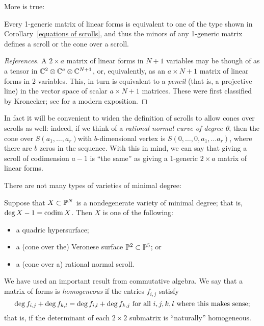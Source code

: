 More is true: 
\begin{fact}
 Every
 1-generic matrix of linear forms is equivalent to one of the type shown in
Corollary~\ref{equations of scrolls}, and thus the minors of any 1-generic matrix defines a scroll or the cone over a scroll.
\end{fact}

\begin{proof}[References]
A $2\times a$ matrix of linear forms in $N+1$ variables may be though of as a tensor
in $\CC^{2}\otimes \CC^{a}\otimes \CC^{N+1}$, or, equivalently, as an $a\times N+1$ matrix of linear forms in 2 variables. This, in turn is equivalent to a \emph{pencil} (that is, a projective line) in the vector space of scalar $a\times N+1$ matrices. These were first classified by Kronecker; see 
\cite[Theorems *** and ***]{Gantmacher} for a modern exposition. 
\end{proof}

In fact it will be convenient to widen the definition of scrolls to allow cones over scrolls as well: indeed, if we think of a \emph{rational normal curve of degree 0}, then the cone over $S(a_{1}, \dots, a_{r})$with $b$-dimensional  vertex is $S(0,\dots,0, a_{1}, \dots a_{r})$, where there are 
$b$ zeros in the sequence. With this in mind, we can say that giving a scroll of codimension $a-1$ is ``the same'' as giving a 1-generic $2\times a$ matrix of linear forms.

There are not many types of varieties of minimal degree:

\begin{fact}
Suppose that $X\subset \PP^{N}$ is a nondegenerate variety of minimal degree; that is, 
$\deg X - 1 = \codim X$. Then $X$ is one of the following:
\begin{itemize}
\item a quadric hypersurface;
\item a (cone over the) Veronese surface $\PP^{2}\subset \PP^{5}$; or
\item a (cone over a) rational normal scroll.
\end{itemize}
\end{fact}


We have used an important result from commutative algebra.
We say that a matrix of forms is \emph{homogeneous} if the entries $f_{i,j}$ satisfy
$$
\deg f_{i,j} + \deg f_{k,l} = \deg f_{i,l}+\deg f_{k,j} \hbox{ for all } i,j,k,l \hbox{ where this makes sense;}
$$
that is, if the determinant of each $2\times 2$ submatrix is ``naturally'' homogeneous.

